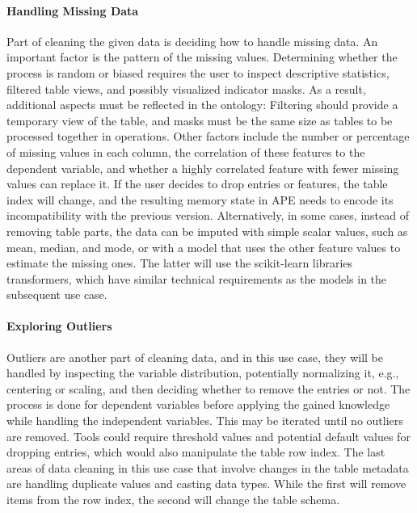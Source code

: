 \paragraph{Handling Missing Data}
Part of cleaning the given data is deciding how to handle missing data. An important factor is the pattern of the missing values. Determining whether the process is random or biased requires the user to inspect descriptive statistics, filtered table views, and possibly visualized indicator masks. As a result, additional aspects must be reflected in the ontology: Filtering should provide a temporary view of the table, and masks must be the same size as tables to be processed together in operations. Other factors include the number or percentage of missing values in each column, the correlation of these features to the dependent variable, and whether a highly correlated feature with fewer missing values can replace it. If the user decides to drop entries or features, the table index will change, and the resulting memory state in APE needs to encode its incompatibility with the previous version. Alternatively, in some cases, instead of removing table parts, the data can be imputed with simple scalar values, such as mean, median, and mode, or with a model that uses the other feature values to estimate the missing ones. The latter will use the scikit-learn libraries transformers, which have similar technical requirements as the models in the subsequent use case.

\paragraph{Exploring Outliers}
Outliers are another part of cleaning data, and in this use case, they will be handled by inspecting the variable distribution, potentially normalizing it, e.g., centering or scaling, and then deciding whether to remove the entries or not. The process is done for dependent variables before applying the gained knowledge while handling the independent variables. This may be iterated until no outliers are removed. Tools could require threshold values and potential default values for dropping entries, which would also manipulate the table row index. The last areas of data cleaning in this use case that involve changes in the table metadata are handling duplicate values and casting data types. While the first will remove items from the row index, the second will change the table schema.


